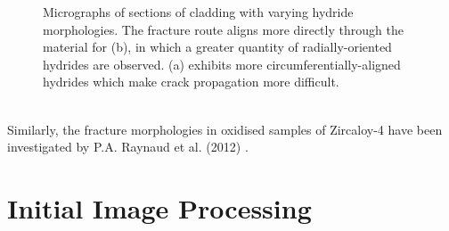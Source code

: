\documentclass{article}
\begin{document}
	\begin{figure}[h]
		\centering
		\hfill
		\caption{Micrographs of sections of cladding with varying hydride morphologies. The fracture route aligns more directly through the material for (b), in which a greater quantity of radially-oriented hydrides are observed. (a) exhibits more circumferentially-aligned hydrides which make crack propagation more difficult.}
		\label{fig:rad_circ_frac}
	\end{figure}
	\\
    Similarly, the fracture morphologies in oxidised samples of Zircaloy-4 have been investigated by P.A. Raynaud et al. (2012) \cite{RAYNAUD201269}.
	\\
	\section{Initial Image Processing}
\end{document}

